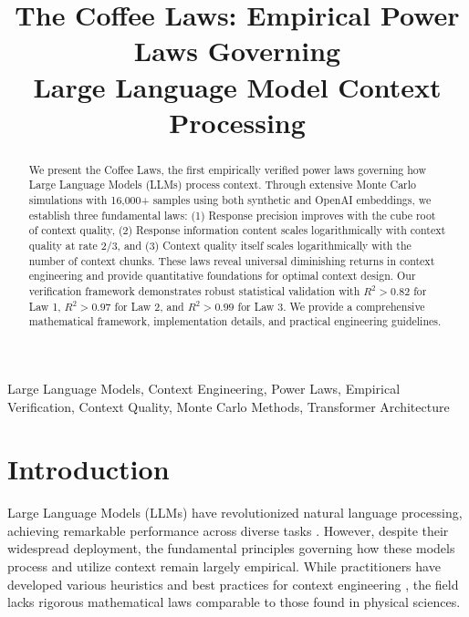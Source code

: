 \documentclass[conference]{IEEEtran}
\begin{document}
\title{The Coffee Laws: Empirical Power Laws Governing\\Large Language Model Context Processing}

\author{
}

\maketitle

\begin{abstract}
We present the Coffee Laws, the first empirically verified power laws governing how Large Language Models (LLMs) process context. Through extensive Monte Carlo simulations with 16,000+ samples using both synthetic and OpenAI embeddings, we establish three fundamental laws: (1) Response precision improves with the cube root of context quality, (2) Response information content scales logarithmically with context quality at rate 2/3, and (3) Context quality itself scales logarithmically with the number of context chunks. These laws reveal universal diminishing returns in context engineering and provide quantitative foundations for optimal context design. Our verification framework demonstrates robust statistical validation with $R^2 > 0.82$ for Law 1, $R^2 > 0.97$ for Law 2, and $R^2 > 0.99$ for Law 3. We provide a comprehensive mathematical framework, implementation details, and practical engineering guidelines.
\end{abstract}

\begin{IEEEkeywords}
Large Language Models, Context Engineering, Power Laws, Empirical Verification, Context Quality, Monte Carlo Methods, Transformer Architecture
\end{IEEEkeywords}

\section{Introduction}

Large Language Models (LLMs) have revolutionized natural language processing, achieving remarkable performance across diverse tasks \cite{brown2020language}. However, despite their widespread deployment, the fundamental principles governing how these models process and utilize context remain largely empirical. While practitioners have developed various heuristics and best practices for context engineering \cite{reynolds2021prompt}, the field lacks rigorous mathematical laws comparable to those found in physical sciences.
\end{document}
